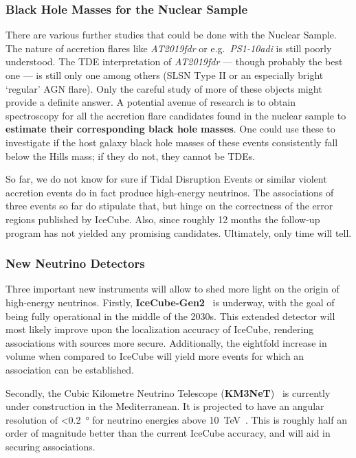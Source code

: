 \subsubsection{Black Hole Masses for the Nuclear Sample}
There are various further studies that could be done with the Nuclear Sample. The nature of accretion flares like \textit{AT2019fdr} or e.g.~\textit{PS1-10adi} is still poorly understood. The TDE interpretation of \textit{AT2019fdr} --- though probably the best one ---  is still only one among others (SLSN Type II or an especially bright `regular' AGN flare). Only the careful study of more of these objects might provide a definite answer. A potential avenue of research is to obtain spectroscopy for all the accretion flare candidates found in the nuclear sample to \textbf{estimate their corresponding black hole masses}. One could use these to investigate if the host galaxy black hole masses of these events consistently fall below the Hills mass; if they do not, they cannot be TDEs.

So far, we do not know for sure if Tidal Disruption Events or similar violent accretion events do in fact produce high-energy neutrinos. The associations of three events so far do stipulate that, but hinge on the correctness of the error regions published by IceCube. Also, since roughly 12 months the follow-up program has not yielded any promising candidates. Ultimately, only time will tell.

\subsubsection{New Neutrino Detectors}
Three important new instruments will allow to shed more light on the origin of high-energy neutrinos. Firstly, \textbf{IceCube-Gen2}~ is underway, with the goal of being fully operational in the middle of the 2030s. This extended detector will most likely improve upon the localization accuracy of IceCube, rendering associations with sources more secure. Additionally, the eightfold increase in volume when compared to IceCube will yield more events for which an association can be established.

Secondly, the Cubic Kilometre Neutrino Telescope (\textbf{KM3NeT})~ is currently under construction in the Mediterranean. It is projected to have an angular resolution of \SI{<0.2}{\degree} for neutrino energies above \SI{10}{\tera\eV}~. This is roughly half an order of magnitude better than the current IceCube accuracy, and will aid in securing associations.

